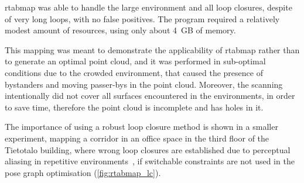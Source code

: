\documentclass[11pt, letterpaper, twoside]{article}
\begin{document}
\gls{rtabmap} was able to handle the large environment and all loop closures,
despite of very long loops, with no false positives. The program required a
relatively modest amount of resources, using only about 4~GB of memory.

This mapping was meant to demonstrate the applicability of \gls{rtabmap} rather
than to generate an optimal point cloud, and it was performed in sub-optimal
conditions due to the crowded environment, that caused the presence of
bystanders and moving passer-bys in the point cloud. Moreover, the scanning
intentionally did not cover all surfaces encountered in the environments, in
order to save time, therefore the point cloud is incomplete and has holes in
it.

The importance of using a robust loop closure method is shown in a smaller
experiment, mapping a corridor in an office space in the third floor of the
Tietotalo building, where wrong loop closures are established due to perceptual
aliasing in repetitive environments~\cite{lajoie2019modeling}, if switchable
constraints are not used in the pose graph optimisation
(\cref{fig:rtabmap_lc}).

\FloatBarrier{}


\end{document}
